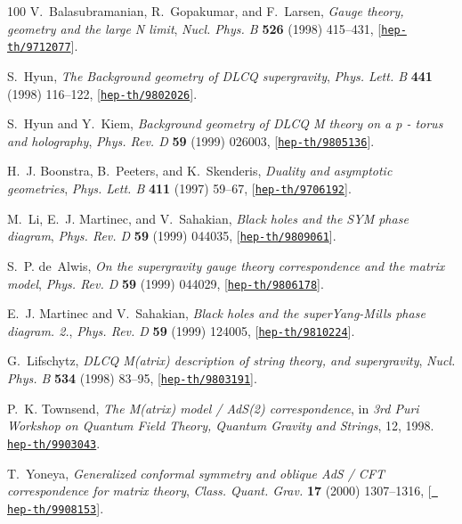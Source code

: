 \documentclass[11pt]{article}
\begin{document}
\begin{thebibliography}{100}
V.~Balasubramanian, R.~Gopakumar, and F.~Larsen, {\it {Gauge theory, geometry
  and the large N limit}},  {\em Nucl. Phys. B} {\bf 526} (1998) 415--431,
  [\href{http://arxiv.org/abs/hep-th/9712077}{{\tt hep-th/9712077}}].

S.~Hyun, {\it {The Background geometry of DLCQ supergravity}},  {\em Phys.
  Lett. B} {\bf 441} (1998) 116--122,
  [\href{http://arxiv.org/abs/hep-th/9802026}{{\tt hep-th/9802026}}].

S.~Hyun and Y.~Kiem, {\it {Background geometry of DLCQ M theory on a p - torus
  and holography}},  {\em Phys. Rev. D} {\bf 59} (1999) 026003,
  [\href{http://arxiv.org/abs/hep-th/9805136}{{\tt hep-th/9805136}}].

H.~J. Boonstra, B.~Peeters, and K.~Skenderis, {\it {Duality and asymptotic
  geometries}},  {\em Phys. Lett. B} {\bf 411} (1997) 59--67,
  [\href{http://arxiv.org/abs/hep-th/9706192}{{\tt hep-th/9706192}}].

M.~Li, E.~J. Martinec, and V.~Sahakian, {\it {Black holes and the SYM phase
  diagram}},  {\em Phys. Rev. D} {\bf 59} (1999) 044035,
  [\href{http://arxiv.org/abs/hep-th/9809061}{{\tt hep-th/9809061}}].

S.~P. de~Alwis, {\it {On the supergravity gauge theory correspondence and the
  matrix model}},  {\em Phys. Rev. D} {\bf 59} (1999) 044029,
  [\href{http://arxiv.org/abs/hep-th/9806178}{{\tt hep-th/9806178}}].

E.~J. Martinec and V.~Sahakian, {\it {Black holes and the superYang-Mills phase
  diagram. 2.}},  {\em Phys. Rev. D} {\bf 59} (1999) 124005,
  [\href{http://arxiv.org/abs/hep-th/9810224}{{\tt hep-th/9810224}}].

G.~Lifschytz, {\it {DLCQ M(atrix) description of string theory, and
  supergravity}},  {\em Nucl. Phys. B} {\bf 534} (1998) 83--95,
  [\href{http://arxiv.org/abs/hep-th/9803191}{{\tt hep-th/9803191}}].

P.~K. Townsend, {\it {The M(atrix) model / AdS(2) correspondence}},  in {\em
  {3rd Puri Workshop on Quantum Field Theory, Quantum Gravity and Strings}},
  12, 1998.
\newblock \href{http://arxiv.org/abs/hep-th/9903043}{{\tt hep-th/9903043}}.

T.~Yoneya, {\it {Generalized conformal symmetry and oblique AdS / CFT
  correspondence for matrix theory}},  {\em Class. Quant. Grav.} {\bf 17}
  (2000) 1307--1316, [\href{http://arxiv.org/abs/hep-th/9908153}{{\tt
  hep-th/9908153}}].


\end{thebibliography}
\end{document}
